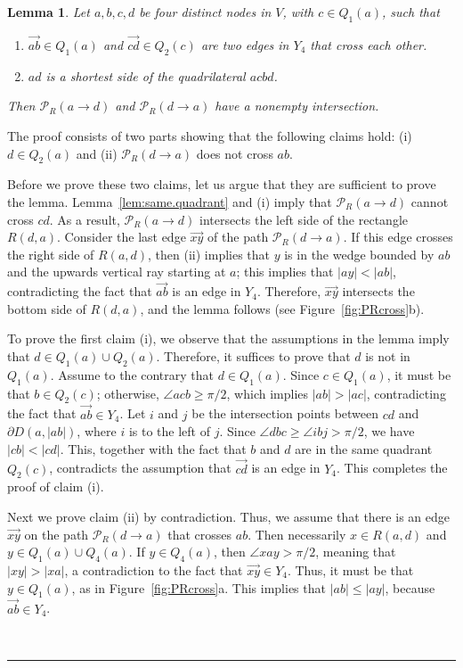 \pdfoutput=1  \documentclass[11pt]{article}
\newtheorem{lemma}{Lemma}
\newcommand{\qed}{\rule{0.5em}{1.5ex}}
\newcommand{\fqed}{{\hfill~\qed}}
\newenvironment{proof}{{\noindent \bf Proof.}}
                      {{\hfill \fqed} \vspace{1em}}
\newcommand{\Pa}{{\mathcal P}}
\begin{document}
\begin{lemma}
Let $a, b, c, d$ be four distinct nodes in $V$, with $c \in Q_1(a)$, such that
\begin{enumerate}
\item [(a)] $\overrightarrow{ab} \in Q_1(a)$ and
$\overrightarrow{cd} \in Q_2(c)$ are two edges in $Y_4$ that cross each other.
\item [(b)] $ad$ is a shortest side of the quadrilateral $acbd$. \end{enumerate}
Then $\Pa_R(a \rightarrow d)$ and $\Pa_R(d \rightarrow a)$ have a nonempty intersection.
\label{lem:ec1}
\end{lemma}
\begin{proof}
The proof consists of two parts showing that the following claims hold:
(i) $d \in Q_2(a)$ and (ii) $\Pa_R(d \rightarrow a)$ does not cross $ab$.

Before we prove these two claims, let us argue that they are sufficient
to prove the lemma. Lemma~\ref{lem:same.quadrant} and (i) imply that
$\Pa_R(a \rightarrow d)$ cannot cross $cd$. As a result,
$\Pa_R(a \rightarrow d)$ intersects the left side of the rectangle $R(d,a)$.
Consider the last edge $\overrightarrow{xy}$ of the path
$\Pa_R(d \rightarrow a)$. If this edge crosses the right side of $R(a,d)$,
then (ii) implies that $y$ is in the wedge bounded by $ab$ and the upwards
vertical ray starting at $a$; this implies that $|ay| < |ab|$, contradicting
the fact that $\overrightarrow{ab}$ is an edge in $Y_4$. Therefore,
$\overrightarrow{xy}$ intersects the bottom side of $R(d,a)$, and the lemma
follows (see Figure~\ref{fig:PRcross}b).

To prove the first claim (i), we observe that the assumptions in the lemma imply
that $d \in Q_1(a) \cup Q_2(a)$. Therefore, it suffices to prove that $d$
is not in $Q_1(a)$. Assume to the contrary that $d \in Q_1(a)$. Since
$c \in Q_1(a)$, it must be that $b \in Q_2(c)$; otherwise, $\angle{acb} \ge \pi/2$,
which implies $|ab| > |ac|$, contradicting the fact that
$\overrightarrow{ab} \in Y_4$. Let $i$ and $j$ be the
intersection points between $cd$ and $\partial D(a,|ab|)$, where $i$ is to
the left of $j$.
Since $\angle{dbc} \geq \angle{ibj} > \pi/2$, we have $|cb| < |cd|$. This,
together with the fact that $b$ and $d$ are in the same quadrant $Q_2(c)$,
contradicts the assumption that $\overrightarrow{cd}$ is an edge in $Y_4$.
This completes the proof of claim (i).

Next we prove claim (ii) by contradiction.
Thus, we assume that there is an edge $\overrightarrow{xy}$ on the path
$\Pa_R(d \rightarrow a)$ that crosses $ab$. Then necessarily
$x \in R(a, d)$ and $y \in Q_1(a) \cup Q_4(a)$.
If $y \in Q_4(a)$, then $\angle{xay} > \pi/2$, meaning that
$|xy| > |xa|$, a contradiction to the fact that $\overrightarrow{xy} \in Y_4$.
Thus, it must be that $y \in Q_1(a)$, as in Figure~\ref{fig:PRcross}a.
This implies that $|ab| \le |ay|$, because $\overrightarrow{ab} \in Y_4$.


\end{proof}
\end{document}
